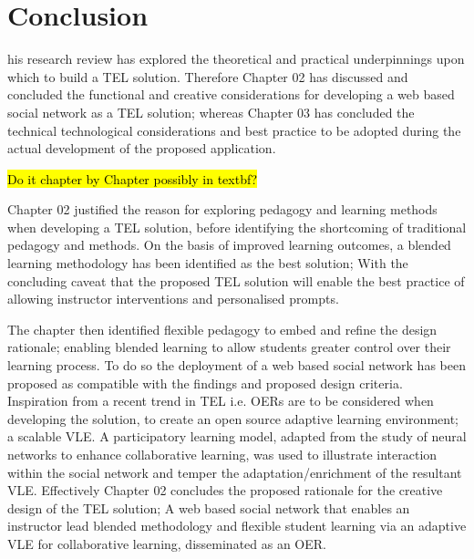 %
%
\let\textcircled=\pgftextcircled
\chapter{Conclusion}
\label{chap:Conclusion}


his research review has explored the theoretical and practical underpinnings upon which to build a TEL solution. Therefore Chapter 02 has discussed and concluded the functional and creative considerations for developing a web based social network as a TEL solution; whereas Chapter 03 has concluded the technical technological considerations and best practice to be adopted during the actual development of the proposed application.

\hl{Do it chapter by Chapter possibly in textbf?}

Chapter 02 justified the reason for exploring pedagogy and learning methods when developing a TEL solution, before identifying the shortcoming of  traditional pedagogy and methods. On the basis of improved learning outcomes, a blended learning methodology has been identified as the best solution; With the concluding caveat that the proposed TEL solution will enable the best practice of allowing instructor interventions and personalised prompts.

The chapter then identified flexible pedagogy to embed and refine the design rationale; enabling blended learning to allow students greater control over their learning process. To do so the deployment of a web based social network has been proposed as compatible with the findings and proposed design criteria. Inspiration from a recent trend in TEL i.e. OERs are to be considered when developing the solution, to create an open source adaptive learning environment; a scalable VLE. A participatory learning model, adapted from the study of neural networks to enhance collaborative learning, was used to illustrate interaction within the social network and temper the adaptation/enrichment of the resultant VLE. Effectively Chapter 02 concludes the proposed rationale for the creative design of the TEL solution; A web based social network that enables an instructor lead blended methodology and flexible student learning via an adaptive VLE for collaborative learning, disseminated as an OER.


